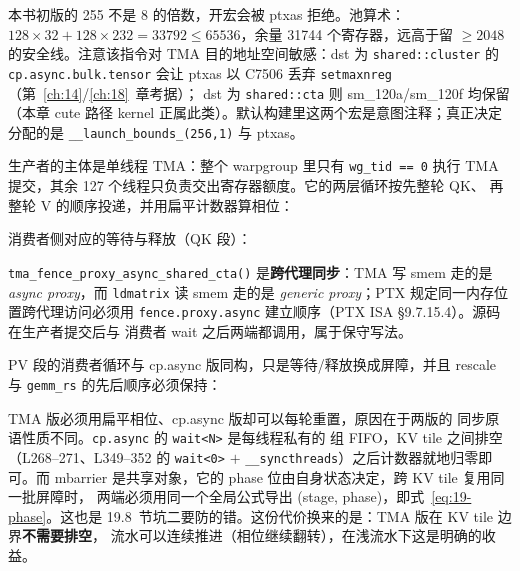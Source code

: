 \begin{itemize}[itemsep=2pt,topsep=2pt]
        本书初版的 255 不是 8 的倍数，开宏会被 ptxas 拒绝。池算术：
        $128 \times 32 + 128 \times 232 = 33792 \le 65536$，余量
        31744 个寄存器，远高于留 $\ge 2048$ 的安全线。注意该指令对 TMA 目的地址空间敏感：dst 为
        \texttt{shared::cluster} 的 \texttt{cp.\allowbreak{}async.\allowbreak{}bulk.\allowbreak{}tensor} 会让 ptxas 以
        C7506 丢弃 \texttt{setmaxnreg}（第~\ref{ch:14}/\ref{ch:18}~章考据）；
        dst 为 \texttt{shared::cta} 则 sm\_120a/sm\_120f 均保留（本章
        cute 路径 kernel 正属此类）。默认构建里这两个宏是意图注释；真正决定
        分配的是 \texttt{\_\allowbreak{}\_\allowbreak{}launch\_\allowbreak{}bounds\_\allowbreak{}(256,\allowbreak{}1)} 与 ptxas。
\end{itemize}

生产者的主体是单线程 TMA：整个 warpgroup 里只有 \texttt{wg\_tid == 0}
执行 TMA 提交，其余 127 个线程只负责交出寄存器额度。它的两层循环按先整轮 QK、
再整轮 V 的顺序投递，并用扁平计数器算相位：



消费者侧对应的等待与释放（QK 段）：



\texttt{tma\_\allowbreak{}fence\_\allowbreak{}proxy\_\allowbreak{}async\_\allowbreak{}shared\_\allowbreak{}cta\allowbreak{}()} 是\textbf{跨代理同步}：TMA 写
smem 走的是 \emph{async proxy}，而 \texttt{ldmatrix} 读 smem 走的是
\emph{generic proxy}；PTX 规定同一内存位置跨代理访问必须用
\texttt{fence.\allowbreak{}proxy.\allowbreak{}async} 建立顺序（PTX ISA §9.7.15.4）。源码在生产者提交后与
消费者 wait 之后两端都调用，属于保守写法。

PV 段的消费者循环与 cp.async 版同构，只是等待/释放换成屏障，并且 rescale 与
\texttt{gemm\_rs} 的先后顺序必须保持：



TMA 版必须用扁平相位、cp.async 版却可以每轮重置，原因在于两版的
同步原语性质不同。\texttt{cp.async} 的 \texttt{wait<N>} 是每线程私有的
组 FIFO，KV tile 之间排空（L268--271、L349--352 的
\texttt{wait<0>} $+$ \texttt{\_\allowbreak{}\_\allowbreak{}syncthreads}）之后计数器就地归零即可。而 mbarrier
是共享对象，它的 phase 位由自身状态决定，跨 KV tile 复用同一批屏障时，
两端必须用同一个全局公式导出 (stage, phase)，即式~\ref{eq:19-phase}。这也是 19.8~节坑二要防的错。这份代价换来的是：TMA 版在 KV tile 边界\textbf{不需要排空}，
流水可以连续推进（相位继续翻转），在浅流水下这是明确的收益。

